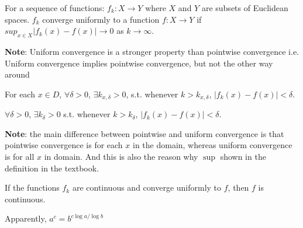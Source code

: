 \begin{definition}
    For a sequence of functions: $f_k : X\rightarrow Y$ where $X$ and $Y$ are subsets 
    of Euclidean spaces. $f_k$ converge uniformly to a function $f:X\rightarrow Y$ if 
    $sup_{x\in X} |f_k(x)- f(x)| \rightarrow 0$ as $k\rightarrow \infty$.
\end{definition}

\textbf{Note}: Uniform convergence is a stronger property than pointwise convergence i.e. Uniform convergence implies pointwise convergence, but not the other way around

\begin{definition}
For each $x\in D$, $\forall\delta > 0$, $\exists k_{x, \delta}>0$, s.t. whenever $k > k_{x, \delta}$, $|f_k(x)-f(x)| < \delta$.
\end{definition}

\begin{definition}
$\forall\delta >0$, $\exists k_\delta>0$ s.t. whenever $k>k_\delta$, $|f_k(x) - f(x)|<\delta$.
\end{definition}

\textbf{Note}: the main difference between pointwise and uniform convergence is that pointwise convergence is for each $x$ in the domain, whereas uniform convergence is for all $x$ in domain. And this is also the reason why $\sup$ shown in the definition in the textbook.



\begin{theorem}
    If the functions $f_k$ are continuous and converge uniformly to $f$, then $f$ is continuous. 
\end{theorem}


\begin{theorem}[Logarithms]
    Apparently, $a^c = b^{c\log a / \log b}$
\end{theorem}
